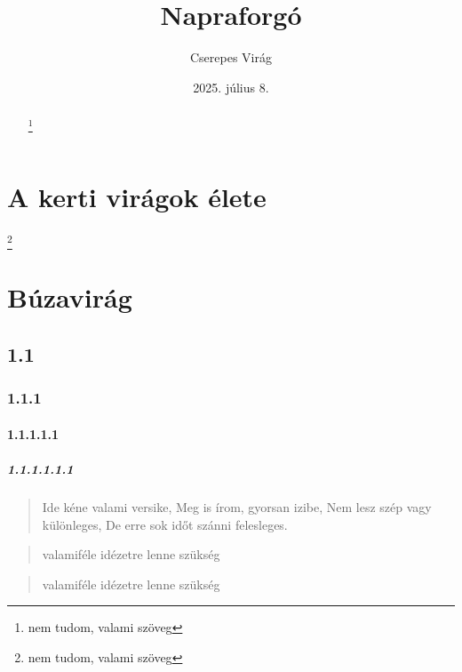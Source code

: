 \documentclass[twoside]{article}
\begin{document}
\begin{abstract}

\hulipsum
\footnote{nem tudom, valami szöveg}
\end{abstract}
\title{Napraforgó}
\author{Cserepes Virág}
\date{2025. július 8.}
\maketitle

\renewcommand{\thefootnote}{\fnsymbol{footnote}}

\section[Virágok]{A kerti virágok élete}
\footnote{nem tudom, valami szöveg}
\subsection{}
\hulipsum
\subsection{}
\hulipsum
\section[A búzavirág]{Búzavirág}
\subsection{1.1}
\subsubsection{1.1.1}
\paragraph{1.1.1.1.1}
\subparagraph{1.1.1.1.1.1}
\tableofcontents
\setcounter{tocdepth}{1.1.1}

\begin{verse}
Ide kéne valami versike,
Meg is írom, gyorsan izibe,
Nem lesz szép vagy különleges,
De erre sok időt szánni felesleges.
\end{verse}

\begin{quote}
valamiféle idézetre lenne szükség
\end{quote}

\begin{quotation}
valamiféle idézetre lenne szükség
\end{quotation}
\end{document}
